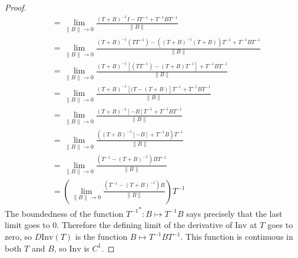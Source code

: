 \documentclass[12pt]{article}
\theoremstyle{definition}
\newenvironment{problem}[2][Problem]{\begin{trivlist}
\item[\hskip \labelsep {\bfseries #1}\hskip \labelsep {\bfseries #2.}]}{\end{trivlist}}
\begin{document}
\begin{problem}{3}
\begin{proof}
\begin{align*}
    &= \lim_{\lVert B \rVert \to 0} \frac{(T + B)^{-1}I - IT^{-1} + T^{-1}BT^{-1}}{\lVert B \rVert}\\
    &= \lim_{\lVert B \rVert \to 0} \frac{(T + B)^{-1}(TT^{-1}) - ((T+B)^{-1}(T+B))T^{-1} + T^{-1}BT^{-1}}{\lVert B \rVert}\\
    &= \lim_{\lVert B \rVert \to 0} \frac{(T + B)^{-1}\left [(TT^{-1}) - (T+B)T^{-1} \right ] + T^{-1}BT^{-1}}{\lVert B \rVert}\\
    &= \lim_{\lVert B \rVert \to 0} \frac{(T + B)^{-1} [(T - (T+B)]T^{-1}  + T^{-1}BT^{-1}}{\lVert B \rVert}\\
    &= \lim_{\lVert B \rVert \to 0} \frac{(T + B)^{-1} [-B]T^{-1}  + T^{-1}BT^{-1}}{\lVert B \rVert}\\
    &= \lim_{\lVert B \rVert \to 0} \frac{((T + B)^{-1} [-B]  + T^{-1}B)T^{-1}}{\lVert B \rVert}\\
    &= \lim_{\lVert B \rVert \to 0} \frac{(T^{-1} - (T + B)^{-1})BT^{-1}}{\lVert B \rVert}\\
    &= \left ( \lim_{\lVert B \rVert \to 0} \frac{(T^{-1} - (T + B)^{-1})B}{\lVert B \rVert} \right )T^{-1}
    \end{align*}
    The boundedness of the function ${T^{-1}}^*: B \mapsto T^{-1}B$  says precisely that the last limit goes to $0$. Therefore the defining limit of the derivative of $\text{Inv}$ at $T$ goes to zero, so $D\text{Inv}(T)$ is the function $B \mapsto T^{-1}BT^{-1}$. This function is continuous in both $T$ and $B$, so $\text{Inv}$ is $C^1$.
\end{proof}
\end{problem}
\end{document}
